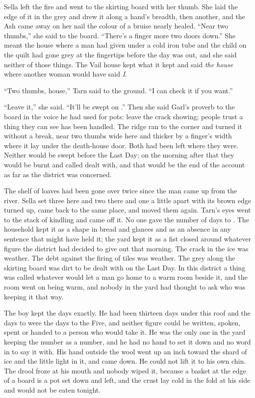 \scenebreak

Sella left the fire and went to the skirting board with her thumb. She laid the edge of it in the grey and drew it along a hand's breadth, then another, and the Ash came away on her nail the colour of a bruise nearly healed. “Near two thumbs,” she said to the board. “There's a finger more two doors down.” She meant the house where a man had given under a cold iron tube and the child on the quilt had gone grey at the fingertips before the day was out, and she said neither of those things. The Vail house kept what it kept and said \emph{the house} where another woman would have said \emph{I}.

“Two thumbs, house,” Tarn said to the ground. “I can check it if you want.”

“Leave it,” she said. “It'll be swept on .” Then she said Garl's proverb to the board in the voice he had used for pots: leave the crack showing; people trust a thing they can see has been handled. The ridge ran to the corner and turned it without a break, near two thumbs wide here and thicker by a finger's width where it lay under the death-house door. Both had been left where they were. Neither would be swept before the Last Day; on the morning after that they would be burnt and called dealt with, and that would be the end of the account as far as the district was concerned.

The shelf of loaves had been gone over twice since the man came up from the river. Sella set three here and two there and one a little apart with its brown edge turned up, came back to the same place, and moved them again. Tarn's eyes went to the stack of kindling and came off it. No one gave the number of days to . The household kept it as a shape in bread and glances and as an absence in any sentence that might have held it; the yard kept it as a fist closed around whatever figure the district had decided to give out that morning. The crack in the ice was weather. The debt against the firing of tiles was weather. The grey along the skirting board was dirt to be dealt with on the Last Day. In this district a thing was called whatever would let a man go home to a warm room beside it, and the room went on being warm, and nobody in the yard had thought to ask who was keeping it that way.

The boy kept the days exactly. He had been thirteen days under this roof and the days to  were the days to the Five, and neither figure could be written, spoken, spent or handed to a person who would take it. He was the only one in the yard keeping the number as a number, and he had no hand to set it down and no word in  to say it with. His hand outside the wool went up an inch toward the shard of ice and the little light in it, and came down. He could not lift it to his own chin. The drool froze at his mouth and nobody wiped it, because a basket at the edge of a board is a pot set down and left, and the crust lay cold in the fold at his side and would not be eaten tonight.

